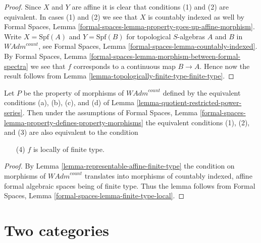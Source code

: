 \begin{proof}
Since $X$ and $Y$ are affine it is clear that conditions (1)
and (2) are equivalent. In cases (1) and (2) we see that
$X$ is countably indexed as well by Formal Spaces, Lemma
\ref{formal-spaces-lemma-property-goes-up-affine-morphism}.
Write $X = \text{Spf}(A)$ and $Y = \text{Spf}(B)$
for topological $S$-algebras $A$ and $B$ in $\textit{WAdm}^{count}$, see
Formal Spaces, Lemma \ref{formal-spaces-lemma-countably-indexed}. By
Formal Spaces, Lemma \ref{formal-spaces-lemma-morphism-between-formal-spectra}
we see that $f$ corresponds to a continuous map $B \to A$.
Hence now the result follows from
Lemma \ref{lemma-topologically-finite-type-finite-type}.
\end{proof}

\begin{lemma}
\label{lemma-finite-type-local-property}
Let $P$ be the property of morphisms of $\textit{WAdm}^{count}$ defined by the
equivalent conditions (a), (b), (c), and (d) of
Lemma \ref{lemma-quotient-restricted-power-series}.
Then under the assumptions of
Formal Spaces, Lemma
\ref{formal-spaces-lemma-property-defines-property-morphisms}
the equivalent conditions
(1), (2), and (3) are also equivalent to the condition
\begin{enumerate}
\item[(4)] $f$ is locally of finite type.
\end{enumerate}
\end{lemma}

\begin{proof}
By Lemma \ref{lemma-representable-affine-finite-type}
the condition on morphisms of $\textit{WAdm}^{count}$
translates into morphisms of countably indexed, affine
formal algebraic spaces being of finite type.
Thus the lemma follows from
Formal Spaces,
Lemma \ref{formal-spaces-lemma-finite-type-local}.
\end{proof}







\section{Two categories}
\label{section-two-categories}

